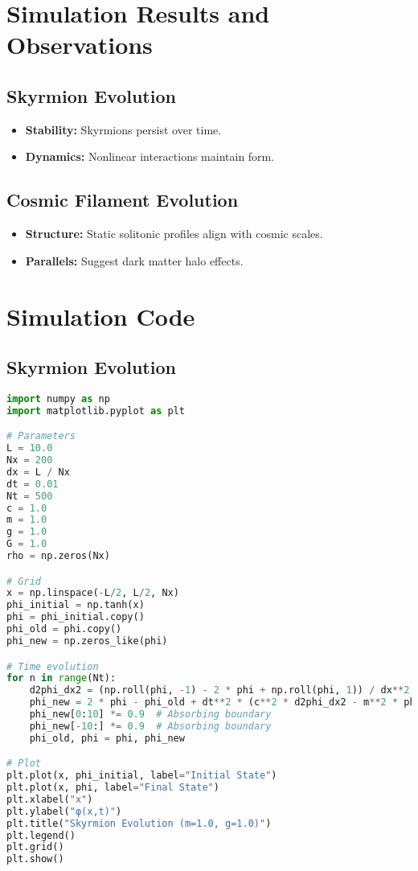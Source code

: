 \documentclass{article}
\begin{document}
\section{Simulation Results and Observations}
\subsection{Skyrmion Evolution}
\begin{itemize}
    \item \textbf{Stability:} Skyrmions persist over time.
    \item \textbf{Dynamics:} Nonlinear interactions maintain form.
\end{itemize}

\subsection{Cosmic Filament Evolution}
\begin{itemize}
    \item \textbf{Structure:} Static solitonic profiles align with cosmic scales.
    \item \textbf{Parallels:} Suggest dark matter halo effects.
\end{itemize}

\section{Simulation Code}
\subsection{Skyrmion Evolution}
\begin{lstlisting}[language=Python, caption=Skyrmion Evolution Simulation, label=lst:skyrmion]
import numpy as np
import matplotlib.pyplot as plt

# Parameters
L = 10.0
Nx = 200
dx = L / Nx
dt = 0.01
Nt = 500
c = 1.0
m = 1.0
g = 1.0
G = 1.0
rho = np.zeros(Nx)

# Grid
x = np.linspace(-L/2, L/2, Nx)
phi_initial = np.tanh(x)
phi = phi_initial.copy()
phi_old = phi.copy()
phi_new = np.zeros_like(phi)

# Time evolution
for n in range(Nt):
    d2phi_dx2 = (np.roll(phi, -1) - 2 * phi + np.roll(phi, 1)) / dx**2  # Periodic base
    phi_new = 2 * phi - phi_old + dt**2 * (c**2 * d2phi_dx2 - m**2 * phi - g * phi**3 + 8 * np.pi * G * rho)
    phi_new[0:10] *= 0.9  # Absorbing boundary
    phi_new[-10:] *= 0.9  # Absorbing boundary
    phi_old, phi = phi, phi_new

# Plot
plt.plot(x, phi_initial, label="Initial State")
plt.plot(x, phi, label="Final State")
plt.xlabel("x")
plt.ylabel("φ(x,t)")
plt.title("Skyrmion Evolution (m=1.0, g=1.0)")
plt.legend()
plt.grid()
plt.show()
\end{lstlisting}
\end{document}
